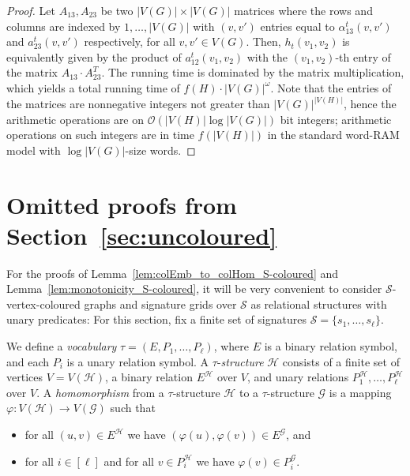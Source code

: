 \documentclass[authorcolumns,numberwithinsect]{no-lipics-v2022}
\begin{document}
\begin{proof}
Let $A_{13}, A_{23}$ be two $|V(G)|\times |V(G)|$ matrices where the rows and columns are indexed by $1, \ldots, |V(G)|$ with $(v, v')$ entries equal to $\alpha^t_{13}(v, v')$ and $a_{23}^t(v, v')$ respectively, for all $v, v' \in V(G)$. Then, $h_t(v_1,v_2)$ is equivalently given by the product of $a_{12}^t(v_1,v_2)$ with the $(v_1, v_2)$-th entry of the matrix $A_{13}\cdot A_{23}^T$. The running time is dominated by the matrix multiplication, which yields a total
running time of $f(H)\cdot|V(G)|^
\omega$. Note that the entries of the matrices are nonnegative integers not greater than $|V(G)|^{|V(H)|}$, hence the arithmetic operations are on $\mathcal{O}(|V(H)|\log{|V(G)|})$ bit integers; arithmetic
operations on such integers are in time $f(|V(H)|)$ in the standard word-RAM model with $\log{|V(G)|}$-size
words.  
\end{proof}

\section{Omitted proofs from Section~\ref{sec:uncoloured}}\label{sec:app-uncol}
For the proofs of Lemma~\ref{lem:colEmb_to_colHom_S-coloured} and Lemma~\ref{lem:monotonicity_S-coloured}, it will be very convenient to consider $\mathcal{S}$-vertex-coloured graphs and signature grids over $\mathcal{S}$ as relational structures with unary predicates: For this section, fix a finite set of signatures $\mathcal{S}=\{s_1,\dots,s_\ell\}$. 

We define a \emph{vocabulary} $\tau=(E,P_1,\dots,P_\ell)$, where $E$ is a binary relation symbol, and each $P_i$ is a unary relation symbol. A $\tau$-\emph{structure} $\mathcal{H}$ consists of a finite set of vertices $V=V(\mathcal{H})$, a binary relation $E^\mathcal{H}$ over $V$, and unary relations $P_1^\mathcal{H},\dots,P_\ell^{\mathcal{H}}$ over $V$.
A \emph{homomorphism} from a $\tau$-structure $\mathcal{H}$ to a $\tau$-structure $\mathcal{G}$ is a mapping $\varphi: V(\mathcal{H}) \to V(\mathcal{G})$ such that
\begin{itemize}
    \item for all $(u,v)\in E^\mathcal{H}$ we have $(\varphi(u),\varphi(v))\in E^\mathcal{G}$, and
    \item for all $i\in[\ell]$ and for all $v\in P_i^\mathcal{H}$ we have $\varphi(v)\in P_i^\mathcal{G}$.
\end{itemize}
\end{document}
